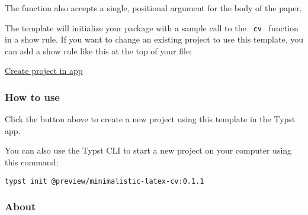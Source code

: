 The function also accepts a single, positional argument for the body of
the paper.

The template will initialize your package with a sample call to the
\texttt{\ cv\ } function in a show rule. If you want to change an
existing project to use this template, you can add a show rule like this
at the top of your file:

\begin{Shaded}
\begin{Highlighting}[]

\NormalTok{  ),}
\NormalTok{)}

\end{Highlighting}
\end{Shaded}

\href{/app?template=minimalistic-latex-cv&version=0.1.1}{Create project
in app}

\subsubsection{How to use}\label{how-to-use}

Click the button above to create a new project using this template in
the Typst app.

You can also use the Typst CLI to start a new project on your computer
using this command:

\begin{verbatim}
typst init @preview/minimalistic-latex-cv:0.1.1
\end{verbatim}



\subsubsection{About}\label{about}

